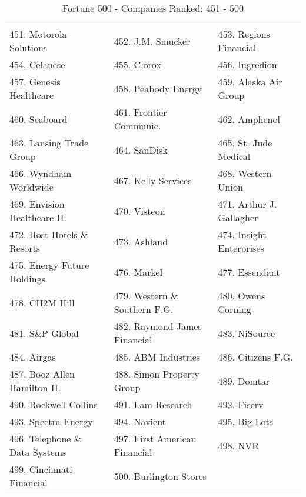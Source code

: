 \documentclass{article}
\begin{document}
\begin{table}[H]
\centering
\caption{Fortune 500 - Companies Ranked: 451 - 500}
\begin{tabular}{lll}
\hline
 \\ 451. Motorola Solutions 
&  452. J.M. Smucker 
&  453. Regions Financial 
\\ 454. Celanese 
&  455. Clorox 
&  456. Ingredion 
\\ 457. Genesis Healthcare 
&  458. Peabody Energy 
&  459. Alaska Air Group 
\\ 460. Seaboard 
&  461. Frontier Communic. 
&  462. Amphenol 
\\ 463. Lansing Trade Group 
&  464. SanDisk 
&  465. St. Jude Medical 
\\ 466. Wyndham Worldwide 
&  467. Kelly Services 
&  468. Western Union 
\\ 469. Envision Healthcare H. 
&  470. Visteon 
&  471. Arthur J. Gallagher 
\\ 472. Host Hotels \& Resorts 
&  473. Ashland 
&  474. Insight Enterprises 
\\ 475. Energy Future Holdings 
&  476. Markel 
&  477. Essendant 
\\ 478. CH2M Hill 
&  479. Western \& Southern F.G. 
&  480. Owens Corning 
\\ 481. S\&P Global 
&  482. Raymond James Financial 
&  483. NiSource 
\\ 484. Airgas 
&  485. ABM Industries 
&  486. Citizens F.G.
\\ 487. Booz Allen Hamilton H. 
&  488. Simon Property Group 
&  489. Domtar 
\\ 490. Rockwell Collins 
&  491. Lam Research 
&  492. Fiserv 
\\ 493. Spectra Energy 
&  494. Navient 
&  495. Big Lots 
\\ 496. Telephone \& Data Systems 
&  497. First American Financial 
&  498. NVR 
\\ 499. Cincinnati Financial 
&  500. Burlington Stores 
&
 \\ \hline

\end{tabular}
\end{table}
\end{document}
